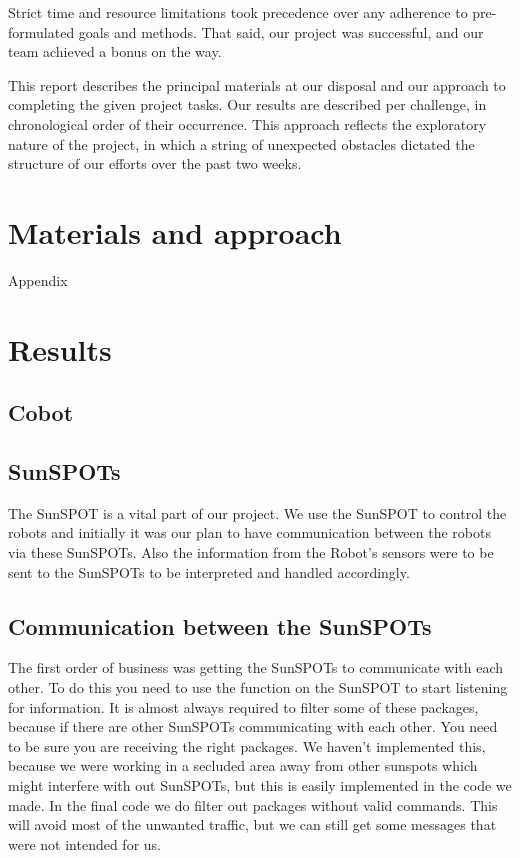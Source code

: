 \documentclass[a4paper,12pt]{article}
\begin{document}
Strict time and resource limitations took precedence over any adherence
to pre-formulated goals and methods. That said, our project was successful,
and our team achieved a bonus on the way.

This report describes the principal materials at our disposal and our approach
to completing the given project tasks. Our results are described per challenge,
in chronological order of their occurrence. This approach reflects the
exploratory nature of the project, in which a string of unexpected obstacles
dictated the structure of our efforts over the past two weeks.

\section{Materials and approach}
Appendix

\section{Results}

\subsection{Cobot}

\subsection{SunSPOTs}
\label{sec:sunspot}

The SunSPOT is a vital part of our project. We use the SunSPOT to control the
robots and initially it was our plan to have communication between the robots
via these SunSPOTs. Also the information from the Robot's sensors were to be
sent to the SunSPOTs to be interpreted and handled accordingly.

\subsection{Communication between the SunSPOTs}
\label{subsec:comm}

The first order of business was getting the SunSPOTs to communicate with each
other. To do this you need to use the function on the SunSPOT to start
listening for information. It is almost always required to filter some of these
packages, because if there are other SunSPOTs communicating with each other.
You need to be sure you are receiving the right packages. We haven't implemented
this, because we were working in a secluded area away from other sunspots which
might interfere with out SunSPOTs, but this is easily implemented in the code
we made. In the final code we do filter out packages without valid commands.
This will avoid most of the unwanted traffic, but we can still get some messages
that were not intended for us. \\
\end{document}
